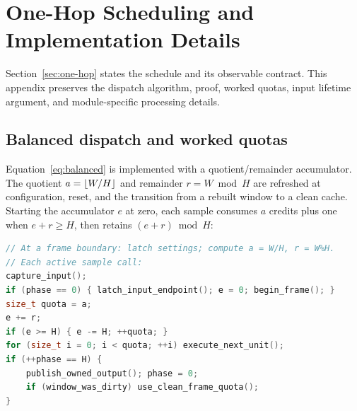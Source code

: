 \section{One-Hop Scheduling and Implementation Details}
\label{app:one-hop}
Section~\ref{sec:one-hop} states the schedule and its observable contract.
This appendix preserves the dispatch algorithm, proof, worked quotas, input
lifetime argument, and module-specific processing details.

\subsection{Balanced dispatch and worked quotas}
Equation~\eqref{eq:balanced} is implemented with a quotient/remainder
accumulator. The quotient $a=\left\lfloor W/H\right\rfloor$ and remainder $r=W\bmod H$ are
refreshed at configuration,
reset, and the transition from a rebuilt window to a clean cache.
Starting the accumulator $e$ at zero, each sample consumes $a$ credits plus one
when $e+r\ge H$, then retains $(e+r)\bmod H$:
\begin{lstlisting}[float=htbp,language=C++,caption={Balanced one-hop dispatch. execute\_next\_unit retains stage and traversal state; output stays private until publication.},label={lst:whole-hop}]
// At a frame boundary: latch settings; compute a = W/H, r = W%H.
// Each active sample call:
capture_input();
if (phase == 0) { latch_input_endpoint(); e = 0; begin_frame(); }
size_t quota = a;
e += r;
if (e >= H) { e -= H; ++quota; }
for (size_t i = 0; i < quota; ++i) execute_next_unit();
if (++phase == H) {
    publish_owned_output(); phase = 0;
    if (window_was_dirty) use_clean_frame_quota();
}
\end{lstlisting}

